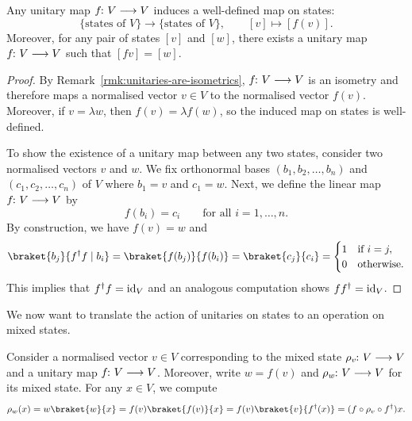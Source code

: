 \documentclass[a4paper, oneside, 12pt]{amsart}
\begin{document}
\begin{lemma}\label{lem:induced-map-on-states}
  Any unitary map \( f \from V \to V \) induces a well-defined map on states:
  \begin{equation}
    \{\text{states of } V\} \to \{\text{states of } V\}, \qquad [v] \mapsto [f(v)].
  \end{equation}
  Moreover, for any pair of states \( [v] \) and \( [w] \), there exists a unitary map \( f \from V\to V\) such that \( [fv] = [w] \).
\end{lemma}
\begin{proof}
  By Remark~\ref{rmk:unitaries-are-isometrics}, \(f\from V\to V\) is an isometry and therefore maps a normalised vector \(v\in V\) to the normalised vector \(f(v)\).
  Moreover, if \( v = \lambda w \), then \( f(v) = \lambda f(w) \), so the induced map on states is well-defined.

  To show the existence of a unitary map between any two states, consider two normalised vectors \( v \) and \( w \).
  We fix  orthonormal bases \( (b_1, b_2, \dots, b_n) \) and \((c_1, c_2, \dots, c_n)\) of \(V\) where \(b_{1} = v\) and \(c_{1} =  w\).
  Next, we define the linear map \( f \from V \to V \) by
  \begin{equation*}
        f (b_i) = c_i \qquad  \text{for all } i = 1, \dots, n.
  \end{equation*}
 By construction, we have \(f(v) = w\) and
 \begin{equation*}
   \braket{b_{j}}{f^{\dagger}f\mid b_{i}} = \braket{f(b_{j})}{f(b_{i})} = \braket{c_{j}}{c_{i}} =
   \begin{cases}
     1 & \text{if } i = j, \\
     0 & \text{otherwise.}
   \end{cases}
 \end{equation*}
 This implies that \(f^{\dagger}f = \mathrm{id}_{V}\) and an analogous computation shows \(ff^{\dagger}=\mathrm{id}_{V}\).
\end{proof}

We now want to translate the action of unitaries on states to an operation on mixed states.

\begin{remark}\label{rmk:unitaries-on-mixed-states}
  Consider a normalised vector \(v \in V \) corresponding to the mixed state \(\rho_{v}\from V\to V\) and a unitary map \( f \from V \to V \).
  Moreover, write \(w = f(v)\) and \(\rho_{w}\from V\to V\) for its mixed state.
  For any \(x\in V\), we compute
  \begin{equation*}
    \rho_{w}(x)
    = w \braket{w}{x}
    = f(v) \braket{f(v)}{x}
    = f(v)\braket{v}{f^{\dagger}(x)}
    = (f \circ \rho_{v} \circ f^{\dagger}) x.
  \end{equation*}
\end{remark}
\end{document}
